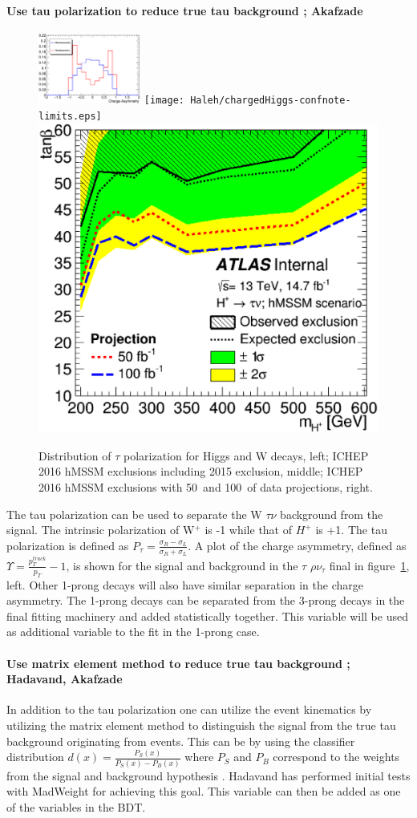 \paragraph{Use tau polarization to reduce true tau background ; Akafzade}
\begin{figure}\label{fig:plot1}
\begin{center}
\includegraphics[height=0.25\textwidth, width=0.30\textwidth]{Haleh/tauAsy.eps}
\texttt{[image: Haleh/chargedHiggs-confnote-limits.eps]}
\includegraphics[height=0.27\textwidth]{Haleh/WithProjection_exclusion_run2016taunu_v2_hmssm_taunu.eps}
\caption{Distribution of $\tau$ polarization for Higgs and W decays, left; ICHEP 2016 hMSSM exclusions including 2015 exclusion, middle; ICHEP 2016 hMSSM exclusions with 50\invfb\ and 100\invfb\ of data projections, right.}
\label{fig:tau}
\end{center}
\end{figure}
The tau polarization can be used to separate the W \too $\tau \nu$ background from the signal.  The intrinsic polarization of W$^+$ is -1 while that of $H^+$ is +1.  The tau polarization is defined as $P_{\tau}=\frac{\sigma_R - \sigma_L}{\sigma_R + \sigma_L}$.
A plot of the charge asymmetry, defined as $\Upsilon=\frac{p_{T}^{track}}{p_T} - 1$, is shown for the signal and background in the $\tau$ \too $\rho \nu_{\tau}$ final in figure~\ref{fig:tau}, left. Other 1-prong decays will also have similar separation in the charge asymmetry. 
The 1-prong decays can be separated from the 3-prong decays in the final fitting machinery and added statistically together.  This variable will be used as additional variable to the fit in the 1-prong case.

\paragraph{Use matrix element method to reduce true tau background ;  Hadavand, Akafzade}
In addition to the tau polarization one can utilize the event kinematics by utilizing the matrix element method to distinguish the signal from the true tau background originating from \ttbar events.  
This can be by using the classifier distribution $d(x)=\frac{P_S(x)}{P_S(x)-P_B(x)}$ where $P_S$ and $P_B$ correspond to the weights from the signal and background 
hypothesis . Hadavand has performed initial tests with MadWeight for achieving this goal. This variable can then be added as one of the variables in the BDT. 

